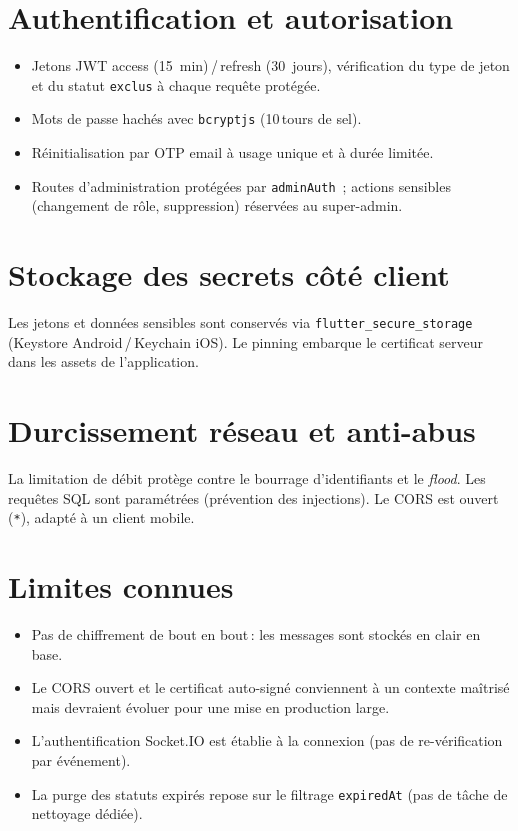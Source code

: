 \documentclass[11pt,a4paper,oneside]{report}
\begin{document}
\section{Authentification et autorisation}
\begin{itemize}[leftmargin=1.3em]
  \item Jetons JWT access (15~min)\,/\,refresh (30~jours), v\'{e}rification du type
        de jeton et du statut \texttt{exclus} \`{a} chaque requ\^{e}te prot\'{e}g\'{e}e.
  \item Mots de passe hach\'{e}s avec \texttt{bcryptjs} (10\,tours de sel).
  \item R\'{e}initialisation par OTP email \`{a} usage unique et \`{a} dur\'{e}e limit\'{e}e.
  \item Routes d'administration prot\'{e}g\'{e}es par \texttt{adminAuth}~; actions
        sensibles (changement de r\^{o}le, suppression) r\'{e}serv\'{e}es au super-admin.
\end{itemize}

\section{Stockage des secrets c\^{o}t\'{e} client}
Les jetons et donn\'{e}es sensibles sont conserv\'{e}s via
\texttt{flutter\_secure\_storage} (Keystore Android\,/\,Keychain iOS). Le pinning
embarque le certificat serveur dans les assets de l'application.

\section{Durcissement r\'{e}seau et anti-abus}
La limitation de d\'{e}bit prot\`{e}ge contre le bourrage d'identifiants et le
\emph{flood}. Les requ\^{e}tes SQL sont param\'{e}tr\'{e}es (pr\'{e}vention des injections).
Le CORS est ouvert (\texttt{*}), adapt\'{e} \`{a} un client mobile.

\section{Limites connues}
\begin{itemize}[leftmargin=1.3em]
  \item Pas de chiffrement de bout en bout\,: les messages sont stock\'{e}s en clair
        en base.
  \item Le CORS ouvert et le certificat auto-sign\'{e} conviennent \`{a} un contexte
        ma\^{i}tris\'{e} mais devraient \'{e}voluer pour une mise en production large.
  \item L'authentification Socket.IO est \'{e}tablie \`{a} la connexion (pas de
        re-v\'{e}rification par \'{e}v\'{e}nement).
  \item La purge des statuts expir\'{e}s repose sur le filtrage \texttt{expiredAt}
        (pas de t\^{a}che de nettoyage d\'{e}di\'{e}e).
\end{itemize}
\end{document}
